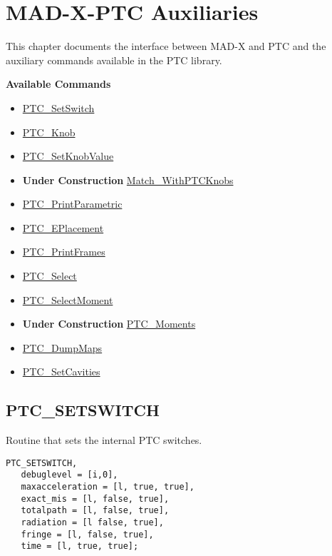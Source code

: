 
\chapter{MAD-X-PTC Auxiliaries}

This chapter documents the interface between MAD-X and PTC and the
auxiliary commands available in the PTC library.

{\bf Available Commands }
\begin{itemize}
   \item \href{PTC_SetSwitch.html}{ PTC\_SetSwitch}
   \item \href{PTC_Knob.html}{ PTC\_Knob}
   \item \href{PTC_SetKnobValue.html}{ PTC\_SetKnobValue}
   \item {\bf Under Construction} \href{Match_WithPTCKnobs.html}{ Match\_WithPTCKnobs}
   \item \href{PTC_PrintParametric.html}{ PTC\_PrintParametric}
   \item \href{PTC_EPlacement.html}{ PTC\_EPlacement}
   \item \href{PTC_PrintFrames.html}{ PTC\_PrintFrames}
   \item \href{PTC_Select.html}{ PTC\_Select}
   \item \href{PTC_SelectMoment.html}{ PTC\_SelectMoment}
   \item {\bf Under Construction} \href{PTC_Moments.html}{ PTC\_Moments}
   \item \href{PTC_DumpMaps.html}{  PTC\_DumpMaps}
   \item \href{PTC_SetCavities.html}{ PTC\_SetCavities}
\end{itemize}

\newpage

%

\section{PTC\_SETSWITCH}

Routine that sets the internal PTC switches.

\begin{verbatim}
PTC_SETSWITCH,
   debuglevel = [i,0], 
   maxacceleration = [l, true, true],
   exact_mis = [l, false, true],
   totalpath = [l, false, true],
   radiation = [l false, true],
   fringe = [l, false, true],
   time = [l, true, true];
\end{verbatim}

